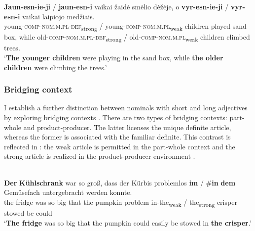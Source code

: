 \documentclass[output=paper,
modfonts
]{langscibook}
\begin{document}
\begin{exe}
	\ex \label{ex:sereikate:51}
	\gll \textbf{Jaun-esn-ie-ji} \textnormal{/} \textbf{jaun-esn-i} {vaikai} {žaidė} {smėlio} {dėžėje}, {o} \textbf{vyr-esn-ie-ji} \textnormal{/} \textbf{vyr-esn-i} {vaikai} {laipiojo} {medžiais}.\\
	{young-\textsc{comp}-\textsc{nom.m.pl}-\textsc{def}\textsubscript{strong}} / {young-\textsc{comp}-\textsc{nom.m.pl}\textsubscript{weak}} children played sand box, while {old-\textsc{comp}-\textsc{nom.m.pl}-\textsc{def}\textsubscript{strong}} / {old-\textsc{comp}-\textsc{nom.m.pl}\textsubscript{weak}} children climbed trees.\\
	\trans `\textbf{The younger children} were playing in the sand box, while \textbf{the older children} were climbing the trees.' 
\end{exe}

\subsubsection{Bridging context}

I establish a further  distinction between nominals with short and long adjectives by exploring bridging contexts \citep{Clark1975}. There are two types of bridging contexts: part-whole and product-producer. The latter licenses the unique definite article, whereas the former is associated with the familiar definite. This contrast is reflected in : the weak article is permitted in the part-whole context  and the strong article is realized in the product-producer environment . 
 
\begin{exe}
	\ex \label{ex:sereikaite:52}
	 \citep[52]{Schwarz2009} \\
	\gll \textbf{Der} \textbf{Kühlschrank} {war} {so} {groß}, {dass} {der} {Kürbis} {problemlos} \textbf{im} \textnormal{/} \#\textbf{in} \textbf{dem} {Gemüsefach} {untergebracht} {werden} {konnte}.\\
	{the} {fridge} was so big that the pumpkin problem {in-the\textsubscript{weak}} / \phantom{\#}{in} {the\textsubscript{strong}} crisper stowed be could\\
	\trans `\textbf{The fridge} was so big that the pumpkin could easily be stowed in \textbf{the crisper}.' 
\end{exe} 
\end{document}
